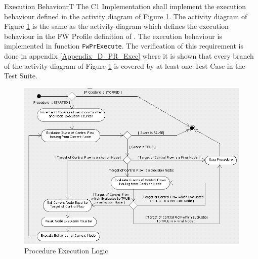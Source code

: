 \documentclass[a4paper,10pt]{article}
\newenvironment{fw_req}[6]
{\addtocounter{subsubsection}{1}
	\hspace{0.2cm}\textbf{FW-\arabic{section}.\arabic{subsection}.\arabic{subsubsection}/#2
	\hspace{0.8cm} #1}
	\vspace{-10pt}
\begin{longtable}{p{2.7cm}P{8.5cm}}
\hline
\textsc{Requirement} & #3 \\
\textsc{Justification} & #4 \\
\textsc{Implementation} & #5  \\ 
\textsc{Verification} & #6  \\
\hline
}
{\end{longtable}}
\begin{document}
\begin{fw_req}{Execution Behaviour}{T}
{The C1 Implementation shall implement the execution behaviour defined in the 
activity diagram of Figure \ref{fig:PrExecuting}.}
{The activity diagram of Figure \ref{fig:PrExecuting} is the same as the activity diagram which defines the execution behaviour in the FW Profile definition of \cite{ref:fwprofile}.}
{The execution behaviour is implemented in function \texttt{FwPrExecute}.} 
{The verification of this requirement is done in appendix 
\ref{Appendix_D_PR_Exec} where it is shown that every branch of the activity diagram of Figure 
\ref{fig:PrExecuting} is covered by at least one Test Case in the Test Suite.}
\end{fw_req}

\begin{figure}[h]
 \centering
 \includegraphics[scale=0.4,keepaspectratio=true]{../images/PR_Execution.png}
 \caption{Procedure Execution Logic}
 \label{fig:PrExecuting}
\end{figure}

\newpage
\end{document}
